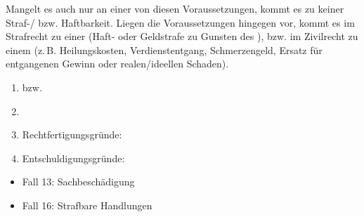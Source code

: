 {Mangelt es auch nur an
einer von diesen Voraussetzungen, kommt es zu keiner
Straf-/ bzw. Haftbarkeit. Liegen die Voraussetzungen
hingegen vor, kommt es im Strafrecht zu einer 
(Haft- oder Geldstrafe zu Gunsten des ), bzw. 
im Zivilrecht zu einem  (z.\,B.
Heilungskosten, Verdienstentgang, Schmerzengeld, Ersatz für
entgangenen Gewinn oder realen/ideellen Schaden).

}{
\begin{enumerate}
  \item {} bzw. 
  \item {}
  \item {}

  Rechtfertigungsgründe:
  \item {}
  
  {Entschuldigungsgründe}:
\end{enumerate}
}



{
\begin{itemize}
  \item Fall 13: Sachbeschädigung
  \dotfill{}
  \item Fall 16: Strafbare Handlungen
  \dotfill{}
\end{itemize}
}
{}
{}
{}
{}


\clearpage

